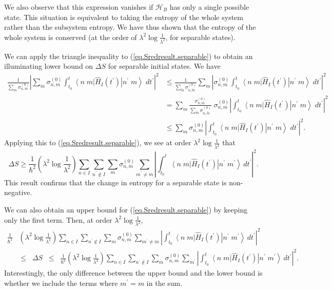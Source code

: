 \documentclass[11pt]{article}
\newcounter{subsubsubsection}[subsubsection]
\newcommand{\bra}[1]{\left\langle#1\right|}
\newcommand{\ket}[1]{\left|#1\right\rangle}
\newcommand{\hilb}{\mathcal{H}}
\newcommand{\op}[1]{\hat{#1}}
\newcommand{\bket}[2]{\ket{#1\;#2}}
\newcommand{\bbra}[2]{\bra{#1\;#2}}
\theoremstyle{theorem}
\theoremstyle{remark}
\theoremstyle{step}
\theoremstyle{gap}
\begin{document}
We also observe that this expression vanishes if \(\hilb_B\) has only a single possible state. This situation is equivalent to taking the entropy of the whole system rather than the subsystem entropy. We have thus shown that the entropy of the whole system is conserved (at the order of \(\lambda^2 \log\frac{1}{\lambda^2}\), for separable states).



We can apply the triangle inequality to (\ref{eq.Sredresult.separable}) to obtain an illuminating lower bound on \(\Delta S\) for separable initial states. We have
\begin{align*}
\frac{1}{\sum_m \sigma_{n,m}^{(0)}} \left|\sum_m{\sigma_{n,m}^{(0)}}\int_{t_0}^t \bbra{n}{m} \op{H}_I(t^\prime) 
 \bket{n^\prime}{m}\;dt^\prime \right|^2
& \leq \frac{1}{\sum_{\tilde{m}} \sigma_{n,\tilde{m}}^{(0)}} \sum_{m} \left|{\sigma_{n,m}^{(0)}}\int_{t_0}^t \bbra{n}{m} \op{H}_I(t^\prime) 
 \bket{n^\prime}{m}\;dt^\prime \right|^2 \\
 &= \sum_m \frac{\sigma_{n,m}^{(0)}}{\sum_{\tilde{m}} \sigma_{n,\tilde{m}}^{(0)}} \;\sigma_{n,m}^{(0)} \left|\int_{t_0}^t \bbra{n}{m} \op{H}_I(t^\prime) 
 \bket{n^\prime}{m}\;dt^\prime \right|^2 \\
 &\leq \sum_m \sigma_{n,m}^{(0)} \left|\int_{t_0}^t \bbra{n}{m} \op{H}_I(t^\prime) 
 \bket{n^\prime}{m}\;dt^\prime \right|^2.
\end{align*}
Applying this to (\ref{eq.Sredresult.separable}), we see at order \(\lambda^2 \log \frac{1}{\lambda^2}\) that
\[
\Delta S \geq \frac{1}{\hbar^2}\left(\lambda^2 \log\frac{1}{\lambda^2}\right) \sum_{n\in I}\sum_{n^\prime \not\in I} \sum_m \sigma_{n,m}^{(0)} \sum_{m^\prime \neq m} \left|\int_{t_0}^t \bbra{n}{m}\op{H}_I (t^{\prime})\bket{n^\prime}{m^\prime} \,dt^{\prime}\right|^2.
\]
This result confirms that the change in entropy for a separable state is non-negative.

We can also obtain an upper bound for (\ref{eq.Sredresult.separable}) by keeping only the first term. Then, at order \(\lambda^2 \log \frac{1}{\lambda^2}\),
\begin{align}\label{eq.dSbounds}
\frac{1}{\hbar^2}&\left(\lambda^2 \log\frac{1}{\lambda^2}\right) \sum_{n\in I}\sum_{n^\prime \not\in I} \sum_m \sigma_{n,m}^{(0)} \sum_{m^\prime \neq m} \left|\int_{t_0}^t \bbra{n}{m}\op{H}_I (t^{\prime})\bket{n^\prime}{m^\prime} \,dt^{\prime}\right|^2 \\
&\leq \;\;\Delta S \;\;\leq\;\; \frac{1}{\hbar^2}\left(\lambda^2 \log\frac{1}{\lambda^2}\right) \sum_{n\in I}\sum_{n^\prime \not\in I} \sum_m \sigma_{n,m}^{(0)} \sum_{m^\prime} \left|\int_{t_0}^t \bbra{n}{m}\op{H}_I (t^{\prime})\bket{n^\prime}{m^\prime} \,dt^{\prime}\right|^2. \nonumber
\end{align}
Interestingly, the only difference between the upper bound and the lower bound is whether we include the terms where \(m^\prime = m\) in the sum.
\end{document}
